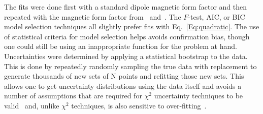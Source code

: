 \documentclass[10pt,aps,prc,twocolumn]{revtex4-1}
\begin{document}
The fits were done first with a standard dipole magnetic form factor
and then repeated with the magnetic form factor from~\cite{Bernauer:2013tpr} and~\cite{Ye:2017gyb}.    
The $F$-test, AIC, or BIC model selection techniques all slightly prefer fits with Eq.~\ref{Eq:quadratic}.
The use of statistical criteria for model selection helps avoids confirmation bias,
though one could still be using an inappropriate function for the problem at hand. 
Uncertainties were determined by applying a statistical bootstrap to the data.   This is done
by repeatedly randomly sampling the true data with replacement to generate thousands of new sets of N points 
and refitting those new sets.   This allows one to get uncertainty distributions using the data itself and
avoids a number of assumptions that are required for $\chi^2$ uncertainty techniques 
to be valid~\cite{Efron:1979} and, unlike $\chi^2$ techniques, is also sensitive to over-fitting~\cite{Andrae:2010}.
\end{document}
